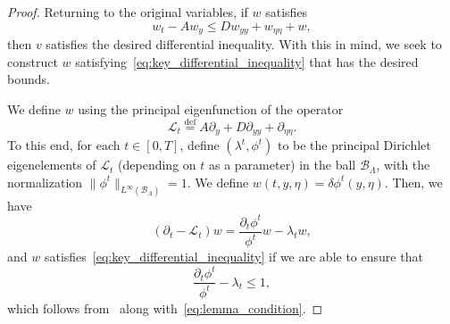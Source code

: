 \documentclass[11pt]{article}    %
\newcommand{\eps}{\varepsilon}
\begin{document}
\begin{proof}
Returning to the original variables, if $w$ satisfies
\begin{equation}\label{eq:key_differential_inequality}
	w_t - A w_y \leq D w_{yy} + w_{\eta\eta} + w,
\end{equation}
then $v$ satisfies the desired differential inequality.  
With this in mind, we seek to construct $w$ satisfying~\eqref{eq:key_differential_inequality} that has the desired bounds.

We define $w$ using the principal eigenfunction of the operator
\begin{equation}\label{eq:L}
	\mathcal{L}_t \stackrel{\text{def}}{=} A \partial_y + D \partial_{yy} + \partial_{\eta\eta}.
\end{equation}
To this end, for each $t \in [0,T]$, define $(\lambda^t,\phi^t)$ to be the principal Dirichlet eigenelements of $\mathcal{L}_t$ (depending on $t$ as a parameter) in the ball $\mathcal{B}_\Lambda$,
with the normalization $\|\phi^t\|_{L^\infty \left(\mathcal{B}_\Lambda\right)} = 1.$
We define $w(t,y,\eta) = \delta \phi^t(y,\eta)$. 
Then, we  have
\begin{equation*}
\left( \partial_t - \mathcal{L}_t \right) w = \frac{\partial_t \phi^t}{\phi^t} w - \lambda_t w,%
\end{equation*}
and
$w$ satisfies~\eqref{eq:key_differential_inequality} if we are able to ensure that 
\begin{equation*}
	\frac{\partial_t \phi^t}{\phi^t}  - \lambda_t \leq 1,
\end{equation*}
which follows from~\cite[Lemmas 5.1 and 5.2]{BHR_Acceleration} along with~\eqref{eq:lemma_condition}.%


\end{proof}
\end{document}
